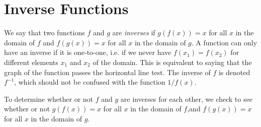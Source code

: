 \section{Inverse Functions}\label{sec:inv_funcs}

We say that two functions $f$ and $g$ are \emph{inverses} if $g(f(x))=x$ for all $x$ in the domain of $f$ and $f(g(x))=x$ for all $x$ in the domain of $g$. A function can only have an inverse if it is one-to-one, i.e. if we never have $f(x_1)=f(x_2)$ for different elements $x_1$ and $x_2$ of the domain. This is equivalent to saying that the graph of the function passes the horizontal line test.
%
The inverse of $f$ is denoted $f^{-1}$, which should not be confused with the function $1/f(x)$.



To determine whether or not $f$ and $g$ are inverses for each other, we check to see whether or not $g(f(x))=x$ for all $x$ in the domain of $f$,and $f(g(x))=x$ for all $x$ in the domain of $g$.

